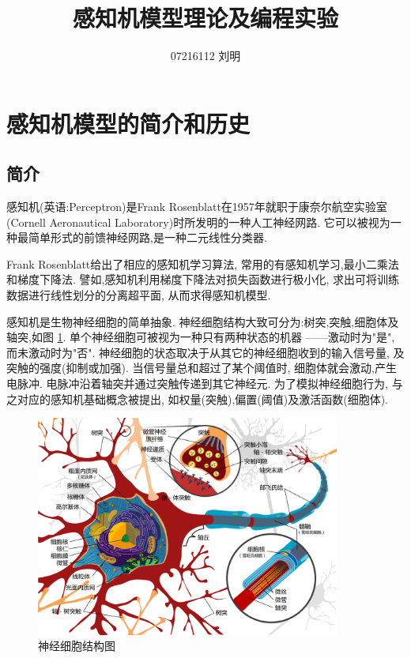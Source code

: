 \documentclass[a4paper,12pt]{article}
\author{07216112 刘明}
\title{感知机模型理论及编程实验}
\begin{document}
    \maketitle

    \tableofcontents

    \newpage

	\section{感知机模型的简介和历史}
		\label{sec:introduction}
		\subsection{简介}
			感知机(英语:Perceptron)是Frank Rosenblatt在1957年就职于康奈尔航空实验室
			(Cornell Aeronautical Laboratory)时所发明的一种人工神经网路.
			它可以被视为一种最简单形式的前馈神经网路,是一种二元线性分类器.

			Frank Rosenblatt给出了相应的感知机学习算法,
			常用的有感知机学习,最小二乘法和梯度下降法.
			譬如,感知机利用梯度下降法对损失函数进行极小化,
			求出可将训练数据进行线性划分的分离超平面,
			从而求得感知机模型.
			
			感知机是生物神经细胞的简单抽象.
			神经细胞结构大致可分为:树突,突触,细胞体及轴突,如图 \ref{fig:neuron}.
			单个神经细胞可被视为一种只有两种状态的机器
			——激动时为"是",而未激动时为"否".
			神经细胞的状态取决于从其它的神经细胞收到的输入信号量,
			及突触的强度(抑制或加强).
			当信号量总和超过了某个阈值时,
			细胞体就会激动,产生电脉冲.
			电脉冲沿着轴突并通过突触传递到其它神经元.
			为了模拟神经细胞行为,
			与之对应的感知机基础概念被提出,
			如权量(突触),偏置(阈值)及激活函数(细胞体).

			\begin{figure}[htbp]
				\centering
				\includegraphics[width=10cm]{./fig/神经细胞结构图.png}
				\caption{ 神经细胞结构图}\label{fig:neuron}
			\end{figure}
			
\end{document}
